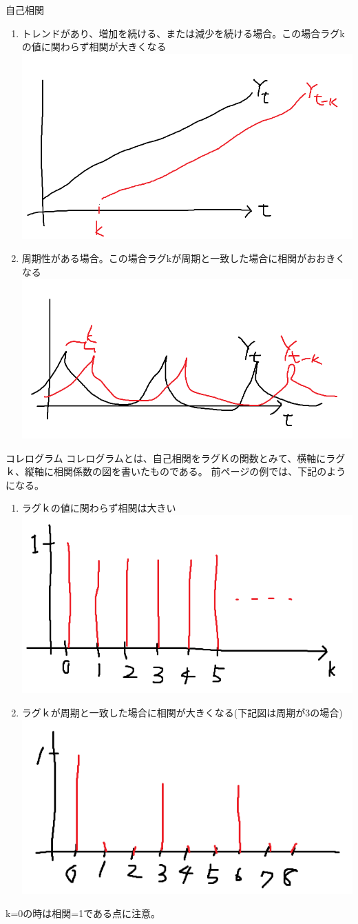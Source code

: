\documentclass[dvipdfmx,autodetect-engine, unicode, 10pt, aspectratio=169]{beamer}
\begin{document}
\begin{frame}{自己相関}
\footnotesize 
\begin{enumerate}
    \item トレンドがあり、増加を続ける、または減少を続ける場合。この場合ラグkの値に関わらず相関が大きくなる
    \includegraphics[width=0.4\linewidth]{trand.png}
    \item 周期性がある場合。この場合ラグkが周期と一致した場合に相関がおおきくなる
    \includegraphics[width=0.4\linewidth]{periodic.png}
\end{enumerate}
\end{frame}

\begin{frame}{コレログラム}
    コレログラムとは、自己相関をラグＫの関数とみて、横軸にラグｋ、縦軸に相関係数の図を書いたものである。
    前ページの例では、下記のようになる。
    \begin{enumerate}
        \item ラグｋの値に関わらず相関は大きい\\
        \includegraphics[width=0.3\linewidth]{correlogram_trend.png}
        \item ラグｋが周期と一致した場合に相関が大きくなる(下記図は周期が3の場合)\\
        \includegraphics[width=0.3\linewidth]{correlogram_periodic.png}
    \end{enumerate}
    k=0の時は相関=1である点に注意。
\end{frame}
\end{document}
